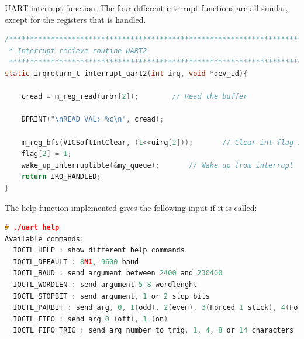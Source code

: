 UART interrupt function. The four different interrupt functions are all similar, except for the registers that is handled. 
\begin{lstlisting}[language=c]
/******************************************************************************
 * Interrupt recieve routine UART2
 *****************************************************************************/
static irqreturn_t interrupt_uart2(int irq, void *dev_id){
	
	cread = m_reg_read(urbr[2]);		// Read the buffer
	
	DPRINT("\nREAD VAL: %c\n", cread);		

	m_reg_bfs(VICSoftIntClear, (1<<uirq[2]));		// Clear int flag in vic
	flag[2] = 1;	
	wake_up_interruptible(&my_queue);		// Wake up from interrupt
	return IRQ_HANDLED;
}
\end{lstlisting}

The help function implemented gives the following input if it is called:
\begin{lstlisting}[language=c]
# ./uart help
Available commands:
  IOCTL_HELP : show different help commands
  IOCTL_DEFAULT : 8N1, 9600 baud
  IOCTL_BAUD : send argument between 2400 and 230400
  IOCTL_WORDLEN : send argument 5-8 wordlenght
  IOCTL_STOPBIT : send argument, 1 or 2 stop bits
  IOCTL_PARBIT : send arg, 0, 1(odd), 2(even), 3(Forced 1 stick), 4(Forced 0 stick
  IOCTL_FIFO : send arg 0 (off), 1 (on)
  IOCTL_FIFO_TRIG : send arg number to trig, 1, 4, 8 or 14 characters
\end{lstlisting}

